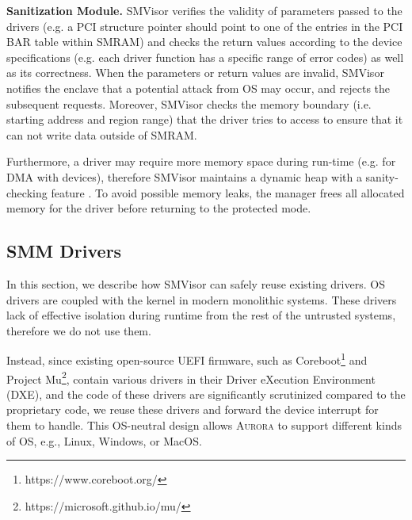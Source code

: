 \textbf{Sanitization Module.}\label{shield}
SMVisor verifies the validity of parameters passed to the drivers (e.g. a PCI structure pointer should point to one of the entries in the \textsf{PCI BAR table} within SMRAM) and checks the return values according to the device specifications (e.g. each driver function has a specific range of error codes) as well as its correctness. When the parameters or return values are invalid, SMVisor notifies the enclave that a potential attack from OS may occur, and rejects the subsequent requests. Moreover, SMVisor checks the memory boundary (i.e. starting address and region range) that the driver tries to access to ensure that it can not write data outside of SMRAM. %

Furthermore, a driver may require more memory space during run-time (e.g. for DMA with devices), therefore SMVisor maintains a dynamic heap with a sanity-checking feature \cite{DBLP:conf/ccs/SilvestroLCLL17}. To avoid possible memory leaks, the manager frees all allocated memory for the driver before returning to the protected mode.

\subsection{SMM Drivers}\label{driver}
In this section, we describe how SMVisor can safely reuse existing drivers. %
OS drivers are coupled with the kernel in modern monolithic systems. These drivers lack of effective isolation during runtime from the rest of the untrusted systems, therefore we do not use them. %

Instead, since existing open-source UEFI firmware, such as Coreboot\footnote{https://www.coreboot.org/} and Project Mu\footnote{https://microsoft.github.io/mu/}, contain various drivers in their Driver eXecution Environment (DXE), and the code of these drivers are significantly scrutinized compared to the proprietary code, we reuse these drivers and forward the device interrupt for them to handle. This OS-neutral design allows \textsc{Aurora} to support different kinds of OS, e.g., Linux, Windows, or MacOS.

